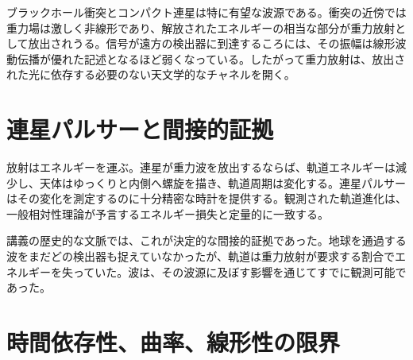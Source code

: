 ブラックホール衝突とコンパクト連星は特に有望な波源である。衝突の近傍では重力場は激しく非線形であり、解放されたエネルギーの相当な部分が重力放射として放出されうる。信号が遠方の検出器に到達するころには、その振幅は線形波動伝播が優れた記述となるほど弱くなっている。したがって重力放射は、放出された光に依存する必要のない天文学的なチャネルを開く。

\section{連星パルサーと間接的証拠}

放射はエネルギーを運ぶ。連星が重力波を放出するならば、軌道エネルギーは減少し、天体はゆっくりと内側へ螺旋を描き、軌道周期は変化する。連星パルサーはその変化を測定するのに十分精密な時計を提供する。観測された軌道進化は、一般相対性理論が予言するエネルギー損失と定量的に一致する。

講義の歴史的な文脈では、これが決定的な間接的証拠であった。地球を通過する波をまだどの検出器も捉えていなかったが、軌道は重力放射が要求する割合でエネルギーを失っていた。波は、その波源に及ぼす影響を通じてすでに観測可能であった。

\begin{classroomqa}
\end{classroomqa}

\begin{classroomqa}
\end{classroomqa}

\section{時間依存性、曲率、線形性の限界}

\begin{classroomqa}
\end{classroomqa}


